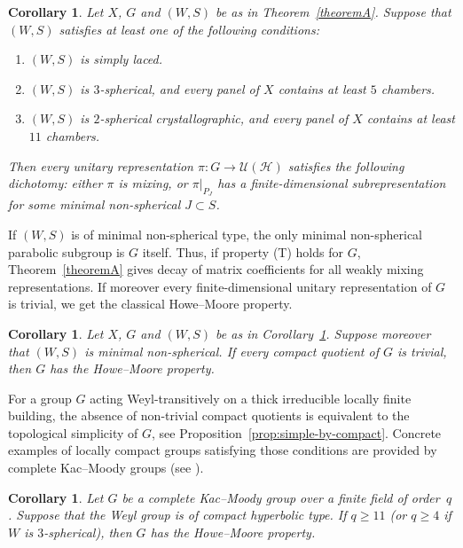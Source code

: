 \documentclass[12pt,a4paper]{amsproc}
\newtheorem{corintro}[thmintro]{Corollary}
\theoremstyle{definition}
\newcommand{\cH}{\mathcal H}
\newcommand{\cU}{\mathcal U}
\begin{document}
\begin{corintro}
\label{corollaryB}
Let $X$, $G$ and $(W,S)$ be as in Theorem~\ref{theoremA}. Suppose that $(W, S)$ satisfies at least  one of the following conditions:
\begin{enumerate}[label=(\arabic*)]
\item $(W, S)$ is simply laced. 
\item $(W, S)$ is $3$-spherical, and every panel of $X$  contains at least $5$ chambers. 
\item $(W, S)$ is $2$-spherical crystallographic, and every panel of $X$ contains  at least $11$ chambers.
\end{enumerate}
Then every unitary representation $\pi \colon G\to\cU(\cH)$ satisfies the following dichotomy: either $\pi$ is mixing, or $\pi|_{P_J}$ has a 
finite-dimensional subrepresentation for some minimal non-spherical $J\subset S$. 
\end{corintro}

If $(W, S)$ is of  minimal non-spherical type, the only minimal non-spherical parabolic subgroup is $G$ itself. Thus, if property (T) holds  for $G$, Theorem~\ref{theoremA} gives decay of matrix coefficients for all weakly mixing representations. If moreover every finite-dimensional unitary representation of $G$ is trivial,   we get the classical Howe--Moore property.


\begin{corintro}
\label{corollaryBB}
Let $X$, $G$ and $(W,S)$ be as in Corollary~\ref{corollaryB}. Suppose moreover that $(W, S)$ is minimal non-spherical. If   every compact quotient of $G$ is trivial, then  $G$ has the Howe--Moore property.
\end{corintro}

For a group $G$ acting Weyl-transitively on a thick irreducible locally finite building, the absence of non-trivial compact quotients is equivalent to the topological simplicity of $G$, see Proposition~\ref{prop:simple-by-compact}. Concrete examples of locally compact groups satisfying those conditions are provided by complete Kac--Moody groups (see \cite[Chapter~8]{Marquis_book}). 

\begin{corintro}
\label{corollary_HM_KM}
Let $G$ be a complete Kac--Moody group over a finite field   of order~$q$. Suppose that the Weyl group  is of compact hyperbolic type. If $q \geq 11$ (or $q \geq 4$ if $W$ is $3$-spherical), then  $G$ has the Howe--Moore property.
\end{corintro}
\end{document}
